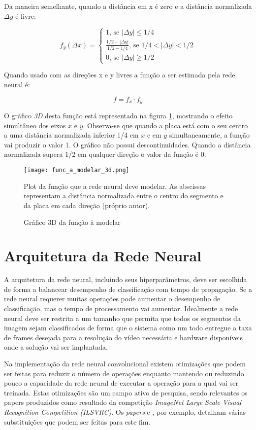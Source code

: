 Da maneira semelhante, quando a distância em x é zero e a distância 
normalizada $\Delta y$ é livre:

\begin{equation}
	f_y(\Delta x) = \begin{cases}
		1 \text{, se } |\Delta y| \leq 1/4
		\\
		\frac{1/2-|\Delta y|}{1/2-1/4} \text{, se } 1/4<|\Delta y|<1/2
		\\
		0 \text{, se } |\Delta y| \geq 1/2
	\end{cases}
\end{equation}

Quando usado com as direções x e y livres a função a ser estimada pela rede
neural é:

\begin{equation} \label{eq:funcao_a_modelar}
	f=f_x \cdot f_y
\end{equation}

O gráfico \emph{3D} desta função está representado na figura
\ref{fig:func_a_modelar_3d}, mostrando o
efeito simultâneo dos eixos $x$ e $y$.  Observa-se que quando a placa
está com o seu centro a uma distância normalizada inferior 1/4 em $x$ e em $y$
simultaneamente, a função vai produzir o valor 1. O gráfico não possui
descontinuidades. Quando a distância normalizada supera 1/2 em qualquer
direção o valor da função é 0.

\begin{figure}[!htb]
	\centering
	\texttt{[image: func\_a\_modelar\_3d.png]}
	\caption{Gráfico 3D da função à modelar}
	\label{fig:func_a_modelar_3d}
	Plot da função que a rede neural deve modelar. As abscissas representam a
	distância normalizada entre o centro do segmento e da placa em cada direção
	(próprio autor).
\end{figure}


\section{Arquitetura da Rede Neural}

A arquitetura da rede neural, incluindo seus hiperparâmetros, deve ser
escolhida de forma a balancear desempenho de classificação com tempo de
propagação. Se a rede neural requerer muitas operações pode aumentar o
desempenho de classificação, mas o tempo de processamento vai aumentar.
Idealmente a rede neural deve ser restrita a um tamanho que permita que todos
os segmentos da imagem sejam classificados de forma que o sistema como um todo
entregue a taxa de frames desejada para a resolução do vídeo necessária e
hardware disponíveis onde a solução vai ser implantada.

Na implementação da rede neural convolucional existem otimizações que podem ser
feitas para reduzir o número de operações enquanto mantendo ou reduzindo pouco
a capacidade da rede neural de executar a operação para a qual vai ser
treinada. Estas otimizações são um campo ativo de pesquisa, sendo relevantes os
papers produzidos como resultado da competição \emph{ImageNet Large Scale
Visual Recognition Competition (ILSVRC)}. Os \emph{papers}
\cite{szegedy2015going} e \cite{szegedy2015rethinking},
por exemplo, detalham várias substituições que podem ser feitas para este fim.


